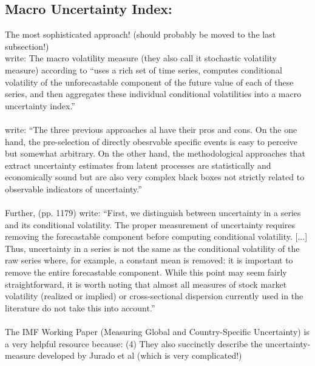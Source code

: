 \documentclass[a4paper,12pt,oneside,pointednumbers,bibtotoc,bigheadings,liststotoc]{scrbook}
\begin{document}
\subsection{Macro Uncertainty Index: \citet{juradoetal:15}}
\label{sec:macrouncertainty}
The most sophisticated approach! (should probably be moved to the last subsection!)\\
\citet{orlikandveldkamp:14} write: The macro volatility measure (they also call it stochastic volatility measure) according to \citet{juradoetal:15} ``uses a rich set of time series, computes conditional volatility of the unforecastable component of the future value of each of these series, and then aggregates these individual conditional volatilities into a macro uncertainty index.''\\
\\
\citet[p. 3]{bontempietal:16} write: ``The three previous approaches al have their pros and cons. On the one hand, the pre-selection of directly obesrvable specific events is easy to perceive but somewhat arbitrary. On the other hand, the methodological approaches that extract uncertainty estimates from latent processes are statistically and economically sound but are also very complex black boxes not strictly related to observable indicators of uncertainty.''
\\
\\
Further, \citet{juradoetal:15} (pp. 1179) write: ``First, we distinguish between uncertainty in a series and its conditional volatility. The proper measurement of uncertainty requires removing the forecastable component before computing conditional volatility. [...] Thus, uncertainty in a series is not the same as the conditional volatility of the raw series where, for example, a constant mean is removed: it is important to remove the entire forecastable component. While this point may seem fairly straightforward, it is worth noting that almost all measures of stock market volatility (realized or implied) or cross-sectional dispersion currently used in the literature do not take this into account.''\\
\\
The IMF Working Paper (Measuring Global and Country-Specific Uncertainty) is a very helpful resource because: (4) They also succinctly describe the uncertainty-measure developed by Jurado et al (which is very complicated!)
\end{document}
